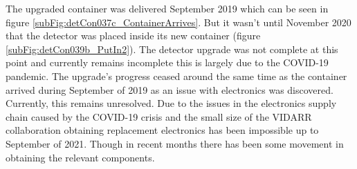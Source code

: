 The upgraded container was delivered September 2019 which can be seen in figure  \ref{subFig:detCon037c_ContainerArrives}. But it wasn't until November 2020 that the detector was placed inside its new container (figure \ref{subFig:detCon039b_PutIn2}). The detector upgrade was not complete at this point and currently remains incomplete this is largely due to the COVID-19 pandemic. The upgrade's progress ceased around the same time as the container arrived during September of 2019 as an issue with electronics was discovered. Currently, this remains unresolved. Due to the issues in the electronics supply chain caused by the COVID-19 crisis and the small size of the VIDARR collaboration obtaining replacement electronics has been impossible up to September of 2021. Though in recent months there has been some movement in obtaining the relevant components. 

